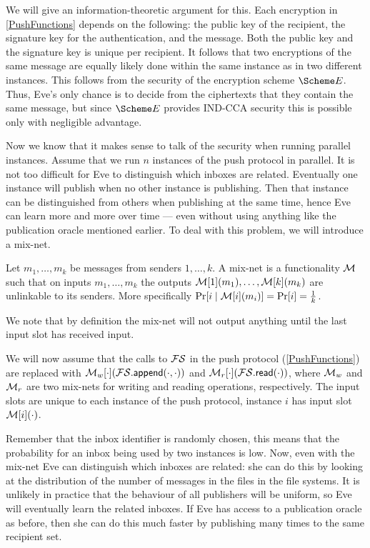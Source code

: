 We will give an information-theoretic argument for this.
Each encryption in \cref{PushFunctions} depends on the following:
the public key of the recipient, the signature key for the authentication, 
and the message.
Both the public key and the signature key is unique per recipient.
It follows that two encryptions of the same message are equally likely done 
within the same instance as in two different instances.
This follows from the security of the encryption scheme \(\E\).
Thus, Eve's only chance is to decide from the ciphertexts that they contain the 
same message, but since \(\E\) provides IND-CCA security this is possible only 
with negligible advantage.

Now we know that it makes sense to talk of the security when running parallel 
instances.
Assume that we run \(n\) instances of the push protocol in parallel.
It is not too difficult for Eve to distinguish which inboxes are related.
Eventually one instance will publish when no other instance is publishing.
Then that instance can be distinguished from others when publishing at the same
time, hence Eve can learn more and more over time --- even without using 
anything like the publication oracle mentioned earlier.
To deal with this problem, we will introduce a mix-net.

\begin{definition}\label{MixNet}
  Let \(m_1, \ldots, m_k\) be messages from senders \(1, \ldots, k\).
  A mix-net is a functionality \(\operatorname{\mathcal{M}}\) such that on inputs \(m_1, \ldots, m_k\) 
  the outputs \(\operatorname{\mathcal{M}}[1](m_1), \ldots, \operatorname{\mathcal{M}}[k](m_k)\) are unlinkable to its senders.
  More specifically \(\Pr[i\mid \operatorname{\mathcal{M}}[i](m_i)] = \Pr[i] = \frac{1}{k}\).
\end{definition}

We note that by definition the mix-net will not output anything until the last
input slot has received input.

We will now assume that the calls to \(\FS\) in the push protocol 
(\cref{PushFunctions}) are replaced with 
\(\M_w[\cdot](\fswrite[\cdot][\cdot])\) and \(\M_r[\cdot](\fsread[\cdot])\), 
where \(\operatorname{\mathcal{M}}_w\) and \(\operatorname{\mathcal{M}}_r\) are two mix-nets for writing and reading 
operations, respectively.
The input slots are unique to each instance of the push protocol, instance 
\(i\) has input slot \(\operatorname{\mathcal{M}}[i](\cdot)\).

Remember that the inbox identifier is randomly chosen, this means that the 
probability for an inbox being used by two instances is low.
Now, even with the mix-net Eve can distinguish which inboxes are related:
she can do this by looking at the distribution of the number of messages in the 
files in the file systems.
It is unlikely in practice that the behaviour of all publishers will be 
uniform, so Eve will eventually learn the related inboxes.
If Eve has access to a publication oracle as before, then she can do this much 
faster by publishing many times to the same recipient set.

